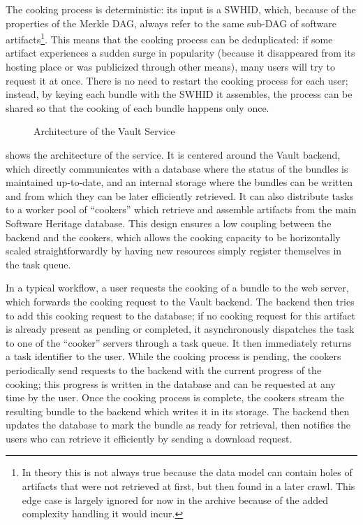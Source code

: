 The cooking process is deterministic: its input is a \gls{SWHID}, which,
because of the properties of the Merkle DAG, always refer to the same sub-DAG
of software artifacts\footnote{In theory this is not always true because the
data model can contain holes of artifacts that were not retrieved at first,
but then found in a later crawl. This edge case is largely ignored for now in
the archive because of the added complexity handling it would incur.}. This
means that the cooking process can be deduplicated: if some artifact
experiences a sudden surge in popularity (because it disappeared from its
hosting place or was publicized through other means), many users will try
to request it at once. There is no need to restart the cooking process for
each user; instead, by keying each bundle with the \gls{SWHID} it
assembles, the process can be shared so that the cooking of each bundle
happens only once.

\begin{figure}[b]
    \centering
    
    \caption{Architecture of the Vault Service}%
    \label{fig:vault-design}
\end{figure}

 shows the architecture of the service. It is centered
around the Vault backend, which directly communicates with a database where the
status of the bundles is maintained up-to-date, and an internal storage where
the bundles can be written and from which they can be later efficiently
retrieved. It can also distribute tasks to a worker pool of ``cookers'' which
retrieve and assemble artifacts from the main Software Heritage database.  This
design ensures a low coupling between the backend and the cookers, which allows
the cooking capacity to be horizontally scaled straightforwardly by having new
resources simply register themselves in the task queue.

In a typical workflow, a user requests the cooking of a bundle to the web
server, which forwards the cooking request to the Vault backend. The backend
then tries to add this cooking request to the database; if no cooking request
for this artifact is already present as pending or completed, it asynchronously
dispatches the task to one of the ``cooker'' servers through a task queue. It
then immediately returns a task identifier to the user. While the cooking
process is pending, the cookers periodically send requests to the backend with
the current progress of the cooking; this progress is written in the database
and can be requested at any time by the user. Once the cooking process is
complete, the cookers stream the resulting bundle to the backend which writes
it in its storage. The backend then updates the database to mark the bundle as
ready for retrieval, then notifies the users who can retrieve it efficiently by
sending a download request.


